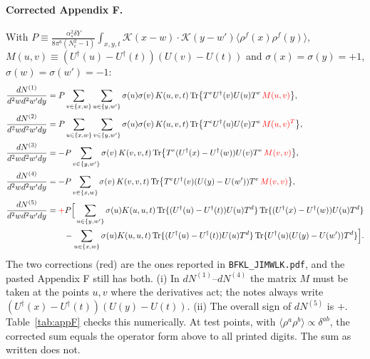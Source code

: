 \documentclass[10pt]{article}
\numberwithin{equation}{section}
\newcommand{\KK}{\mathcal K}
\newcommand{\Ud}{U^{\dagger}}
\newcommand{\Tr}{{\rm Tr}}
\begin{document}
\paragraph{Corrected Appendix F.} With $P\equiv\frac{\alpha_s^2\delta Y}{8\pi^6(N_c^2-1)}\int_{x,y,t}\KK(x-w)\cdot\KK(y-w')\langle\rho^f(x)\rho^f(y)\rangle$, $M(u,v)\equiv(\Ud(u)-\Ud(t))(U(v)-U(t))$ and $\sigma(x)=\sigma(y)=+1$, $\sigma(w)=\sigma(w')=-1$:
\begin{align}
\frac{dN^{(1)}}{d^2wd^2w'dy}&=P\sum_{v\in\{x,w\}}\sum_{u\in\{y,w'\}}\sigma(u)\sigma(v)\,K(u,v,t)\,\Tr\big\{T^e\Ud(v)U(u)T^e\,\textcolor{red}{M(u,v)}\big\},\notag\\
\frac{dN^{(2)}}{d^2wd^2w'dy}&=P\sum_{u\in\{x,w\}}\sum_{v\in\{y,w'\}}\sigma(u)\sigma(v)\,K(u,v,t)\,\Tr\big\{T^e\Ud(u)U(v)T^e\,\textcolor{red}{M(u,v)^T}\big\},\notag\\
\frac{dN^{(3)}}{d^2wd^2w'dy}&=-P\sum_{v\in\{y,w'\}}\sigma(v)\,K(v,v,t)\,\Tr\big\{T^e(\Ud(x)-\Ud(w))U(v)T^e\,\textcolor{red}{M(v,v)}\big\},\notag\\
\frac{dN^{(4)}}{d^2wd^2w'dy}&=-P\sum_{v\in\{x,w\}}\sigma(v)\,K(v,v,t)\,\Tr\big\{T^e\Ud(v)(U(y)-U(w'))T^e\,\textcolor{red}{M(v,v)}\big\},\notag\\
\frac{dN^{(5)}}{d^2wd^2w'dy}&=\textcolor{red}{+}P\Big[\sum_{u\in\{y,w'\}}\sigma(u)K(u,u,t)\,\Tr\{(\Ud(u)-\Ud(t))U(u)T^d\}\,\Tr\{(\Ud(x)-\Ud(w))U(u)T^d\}\notag\\
&\qquad-\sum_{u\in\{x,w\}}\sigma(u)K(u,u,t)\,\Tr\{(\Ud(u)-\Ud(t))U(u)T^d\}\,\Tr\{\Ud(u)(U(y)-U(w'))T^d\}\Big].
\end{align}
The two corrections (red) are the ones reported in \texttt{BFKL\_JIMWLK.pdf}, and the pasted Appendix F still has both. (i) In $dN^{(1)}$--$dN^{(4)}$ the matrix $M$ must be taken at the points $u,v$ where the derivatives act; the notes always write $(\Ud(x)-\Ud(t))(U(y)-U(t))$. (ii) The overall sign of $dN^{(5)}$ is $+$. Table~\ref{tab:appF} checks this numerically. At test points, with $\langle\rho^a\rho^b\rangle\propto\delta^{ab}$, the corrected sum equals the operator form above to all printed digits. The sum as written does not.
\end{document}
